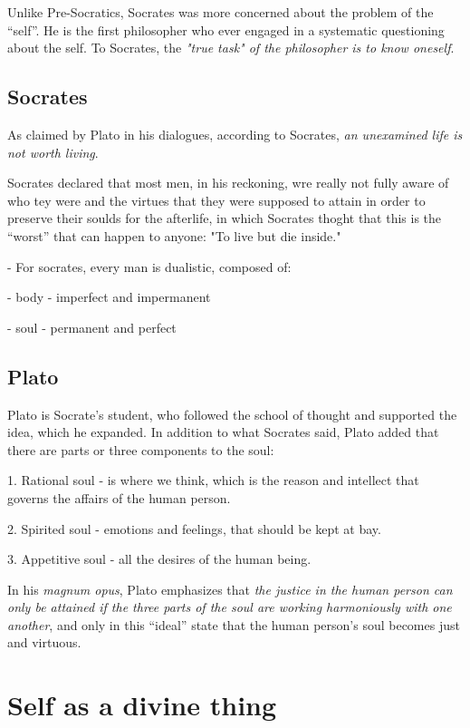 \documentclass[12pt, UTF8]{article}
\begin{document}
	Unlike Pre-Socratics, Socrates was more concerned about the problem of the ``self''. He is the first philosopher who ever engaged in a systematic questioning about the self. To Socrates, the \textit{"true task"  of the philosopher is to know oneself}.
	
	\subsection*{Socrates}
	
	As claimed by Plato in his dialogues, according to Socrates, \emph{an unexamined life is not worth living}.
	
	Socrates declared that most men, in his reckoning, wre really not fully aware of who tey were and the virtues that they were supposed to attain in order to preserve their soulds for the afterlife, in which Socrates thoght that this is the ``worst'' that can happen to anyone: "To live but die inside."
	
	- For socrates, every man is dualistic, composed of:
	
	- body - imperfect and impermanent
	
	- soul - permanent and perfect
	
	\subsection*{Plato}
	
	Plato is Socrate's student, who followed the school of thought and supported the idea, which he expanded. In addition to what Socrates said, Plato added that there are parts or three components to the soul:
	
	1. Rational soul - is where we think, which is the reason and intellect that governs the affairs of the human person.
	
	2. Spirited soul - emotions and feelings, that should be kept at bay.
	
	3. Appetitive soul - all the desires of the human being.
	
	In his \textit{magnum opus}, Plato emphasizes that \emph{the justice in the human person can only be attained if the three parts of the soul are working harmoniously with one another}, and only in this ``ideal'' state that the human person's soul becomes just and virtuous.
	
	\section{Self as a divine thing}
	
\end{document}
